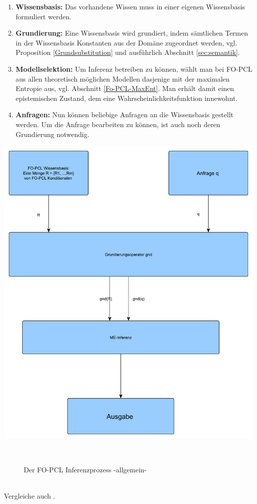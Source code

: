 \documentclass[a4paper, 11pt]{book}
\begin{document}
\begin{enumerate}
	
\item \textbf{Wissensbasis:} 
Das vorhandene Wissen muss in einer eigenen Wissensbasis formuliert werden.
\item \textbf{Grundierung:}
Eine Wissensbasis wird grundiert, indem sämtlichen Termen in der Wissensbasis Konstanten aus der Domäne zugeordnet werden, vgl. Proposition  \ref{Grundsubstitution} und ausführlich Abschnitt \ref{sec:semantik}.
\item \textbf{Modellselektion:}
Um Inferenz betreiben zu können, wählt man bei FO-PCL aus allen theoretisch möglichen Modellen dasjenige mit der maximalen Entropie aus, vgl. Abschnitt \ref{Fo-PCL-MaxEnt}. Man erhält damit einen epistemischen Zustand, dem eine Wahrscheinlichkeitsfunktion innewohnt.
\item \textbf{Anfragen:}
Nun können beliebige Anfragen an die Wissensbasis gestellt werden. Um die Anfrage bearbeiten zu können, ist auch noch deren Grundierung notwendig. 

\end{enumerate}
\newpage
\includegraphics[scale = 0.5]{Graphics/FO-PCL_Inferenzprozess}
\begin{figure}[h]
	\caption{Der FO-PCL Inferenzprozess -allgemein- }\
\end{figure}
\\
Vergleiche auch \cite{BHM14}.
\end{document}
